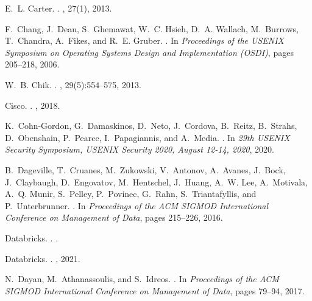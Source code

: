 \documentclass[11pt,dvipdfmx]{article}
\begin{document}
\begin{thebibliography}{10}
\begin{small}
  E.~L. Carter.
  .
  , 27(1), 2013.
  
  F.~Chang, J.~Dean, S.~Ghemawat, W.~C. Hsieh, D.~A. Wallach, M.~Burrows,
    T.~Chandra, A.~Fikes, and R.~E. Gruber.
  .
  \newblock In {\em Proceedings of the USENIX Symposium on Operating Systems
    Design and Implementation (OSDI)}, pages 205--218, 2006.
  
  W.~B. Chik.
  .
  , 29(5):554--575, 2013.
  
  Cisco.
  .
  , 2018.
  
  K.~Cohn-Gordon, G.~Damaskinos, D.~Neto, J.~Cordova, B.~Reitz, B.~Strahs,
    D.~Obenshain, P.~Pearce, I.~Papagiannis, and A.~Media.
  .
  \newblock In {\em 29th USENIX Security Symposium, USENIX Security 2020, August
    12-14, 2020}, 2020.
  
  B.~Dageville, T.~Cruanes, M.~Zukowski, V.~Antonov, A.~Avanes, J.~Bock,
    J.~Claybaugh, D.~Engovatov, M.~Hentschel, J.~Huang, A.~W. Lee, A.~Motivala,
    A.~Q. Munir, S.~Pelley, P.~Povinec, G.~Rahn, S.~Triantafyllis, and
    P.~Unterbrunner.
  .
  \newblock In {\em Proceedings of the ACM SIGMOD International Conference on
    Management of Data}, pages 215--226, 2016.
  
  Databricks.
  .
  .
  
  Databricks.
  .
  ,
    2021.
  
  N.~Dayan, M.~Athanassoulis, and S.~Idreos.
  .
  \newblock In {\em Proceedings of the ACM SIGMOD International Conference on
    Management of Data}, pages 79--94, 2017.
  

\end{small}
\end{thebibliography}
\end{document}

